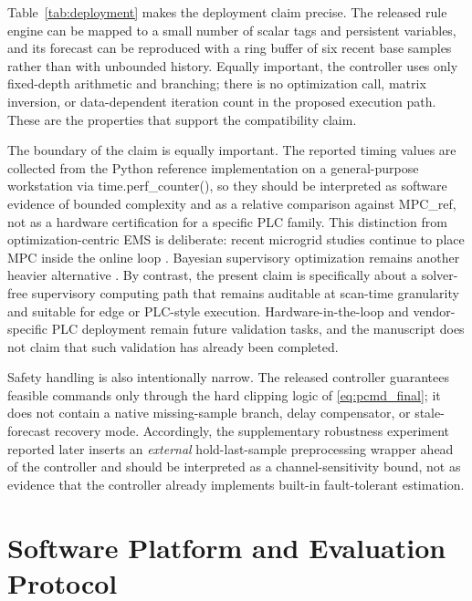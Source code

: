 \documentclass[preprint,12pt]{elsarticle}
\def\texttt#1{#1}%
\begin{document}
Table~\ref{tab:deployment} makes the deployment claim precise. The released rule engine can be mapped to a small number of scalar tags and persistent variables, and its forecast can be reproduced with a ring buffer of six recent base samples rather than with unbounded history. Equally important, the controller uses only fixed-depth arithmetic and branching; there is no optimization call, matrix inversion, or data-dependent iteration count in the proposed execution path. These are the properties that support the compatibility claim.

The boundary of the claim is equally important. The reported timing values are collected from the Python reference implementation on a general-purpose workstation via \texttt{time.perf\_counter()}, so they should be interpreted as software evidence of bounded complexity and as a relative comparison against \texttt{MPC\_ref}, not as a hardware certification for a specific PLC family. This distinction from optimization-centric EMS is deliberate: recent microgrid studies continue to place MPC inside the online loop \cite{li2025twotimescale}. Bayesian supervisory optimization remains another heavier alternative \cite{brown2026bayesian}. By contrast, the present claim is specifically about a solver-free supervisory computing path that remains auditable at scan-time granularity and suitable for edge or PLC-style execution. Hardware-in-the-loop and vendor-specific PLC deployment remain future validation tasks, and the manuscript does not claim that such validation has already been completed.

Safety handling is also intentionally narrow. The released controller guarantees feasible commands only through the hard clipping logic of \eqref{eq:pcmd_final}; it does not contain a native missing-sample branch, delay compensator, or stale-forecast recovery mode. Accordingly, the supplementary robustness experiment reported later inserts an \emph{external} hold-last-sample preprocessing wrapper ahead of the controller and should be interpreted as a channel-sensitivity bound, not as evidence that the controller already implements built-in fault-tolerant estimation.

\section{Software Platform and Evaluation Protocol} \label{sec:experiments}
\end{document}
